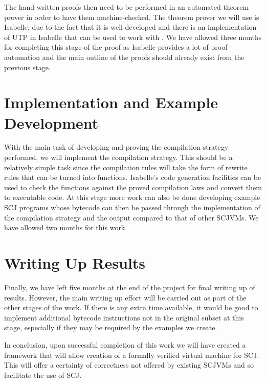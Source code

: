 \documentclass[a4paper,10pt]{report}
\begin{document}
The hand-written proofs then need to be performed in an automated
theorem prover in order to have them machine-checked.
The theorem prover we will use is Isabelle, due to the fact that it is
well developed and there is an implementation of UTP in Isabelle that
can be used to work with \Circus{}.
We have allowed three months for completing this stage of the proof as
Isabelle provides a lot of proof automation and the main outline of
the proofs should already exist from the previous stage.

\section{Implementation and Example Development}

With the main task of developing and proving the compilation strategy
performed, we will implement the compilation strategy.
This should be a relatively simple task since the compilation rules
will take the form of rewrite rules that can be turned into functions.
Isabelle's code generation facilities can be used to check the
functions against the proved compilation laws and convert them to
executable code.
At this stage more work can also be done developing example SCJ
programs whose bytecode can then be passed through the implementation
of the compilation strategy and the output compared to that of other
SCJVMs.
We have allowed two months for this work.

\section{Writing Up Results}

Finally, we have left five months at the end of the project for final
writing up of results.
However, the main writing up effort will be carried out as part of the
other stages of the work.
If there is any extra time available, it would be good to implement
additional bytecode instructions not in the original subset at this
stage, especially if they may be required by the examples we create.

In conclusion, upon successful completion of this work we will have
created a framework that will allow creation of a formally verified
virtual machine for SCJ.
This will offer a certainty of correctness not offered by existing
SCJVMs and so facilitate the use of SCJ.
\end{document}

